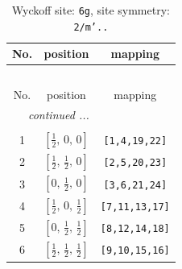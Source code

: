\documentclass[fleqn,8pt]{jsarticle}
\begin{document}
\renewcommand{\arraystretch}{1.2}
\begin{longtable}{ccc}
\caption{Wyckoff site: {\tt 6g}, site symmetry: {\tt 2/m'..}}
 \\
 \hline \hline
No. & position & mapping \\ \hline \endfirsthead

\multicolumn{2}{l}{\tablename\ \thetable{}} \\
 \hline \hline
No. & position & mapping \\ \hline \endhead

 \hline \hline
\multicolumn{2}{r}{\footnotesize\it continued ...} \\ \endfoot

 \hline \hline
\multicolumn{2}{r}{} \\ \endlastfoot

1 & $\left[ \frac{1}{2},\, 0,\, 0 \right]$ & {\tt [1,4,19,22]} \\ \hline
2 & $\left[ \frac{1}{2},\, \frac{1}{2},\, 0 \right]$ & {\tt [2,5,20,23]} \\ \hline
3 & $\left[ 0,\, \frac{1}{2},\, 0 \right]$ & {\tt [3,6,21,24]} \\ \hline
4 & $\left[ \frac{1}{2},\, 0,\, \frac{1}{2} \right]$ & {\tt [7,11,13,17]} \\ \hline
5 & $\left[ 0,\, \frac{1}{2},\, \frac{1}{2} \right]$ & {\tt [8,12,14,18]} \\ \hline
6 & $\left[ \frac{1}{2},\, \frac{1}{2},\, \frac{1}{2} \right]$ & {\tt [9,10,15,16]} \\
\end{longtable}
\renewcommand{\arraystretch}{1.2}
\end{document}
